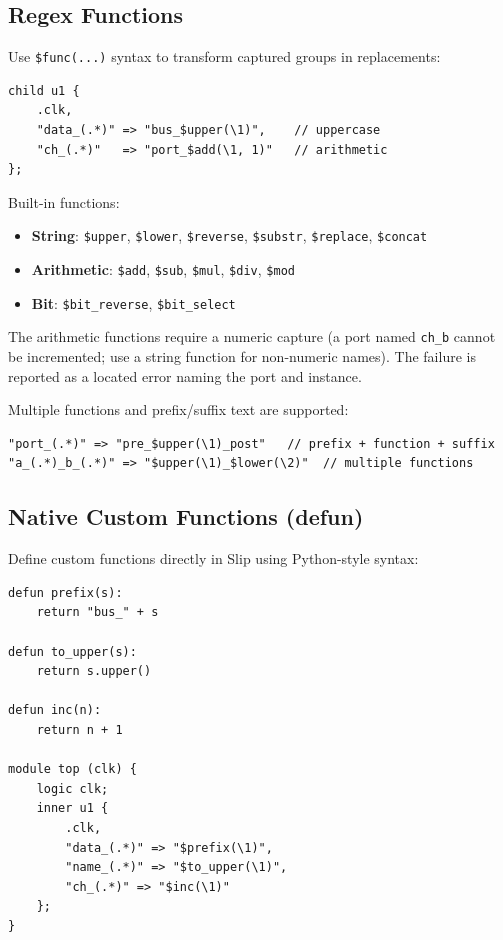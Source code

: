 \documentclass[lang=en,11pt]{elegantbook}
\newcommand{\code}[1]{\texttt{#1}}
\begin{document}
\subsection{Regex Functions}

Use \code{\$func(...)} syntax to transform captured groups in replacements:

\begin{lstlisting}[language=Slip]
child u1 {
    .clk,
    "data_(.*)" => "bus_$upper(\1)",    // uppercase
    "ch_(.*)"   => "port_$add(\1, 1)"   // arithmetic
};
\end{lstlisting}

Built-in functions:
\begin{itemize}
  \item \textbf{String}: \code{\$upper}, \code{\$lower}, \code{\$reverse}, \code{\$substr}, \code{\$replace}, \code{\$concat}
  \item \textbf{Arithmetic}: \code{\$add}, \code{\$sub}, \code{\$mul}, \code{\$div}, \code{\$mod}
  \item \textbf{Bit}: \code{\$bit\_reverse}, \code{\$bit\_select}
\end{itemize}

The arithmetic functions require a numeric capture (a port named \code{ch\_b} cannot be incremented; use a string function for non-numeric names). The failure is reported as a located error naming the port and instance.

Multiple functions and prefix/suffix text are supported:
\begin{lstlisting}[language=Slip]
"port_(.*)" => "pre_$upper(\1)_post"   // prefix + function + suffix
"a_(.*)_b_(.*)" => "$upper(\1)_$lower(\2)"  // multiple functions
\end{lstlisting}

\subsection{Native Custom Functions (defun)}

Define custom functions directly in Slip using Python-style syntax:

\begin{lstlisting}[language=Slip]
defun prefix(s):
    return "bus_" + s

defun to_upper(s):
    return s.upper()

defun inc(n):
    return n + 1

module top (clk) {
    logic clk;
    inner u1 {
        .clk,
        "data_(.*)" => "$prefix(\1)",
        "name_(.*)" => "$to_upper(\1)",
        "ch_(.*)" => "$inc(\1)"
    };
}
\end{lstlisting}
\end{document}
